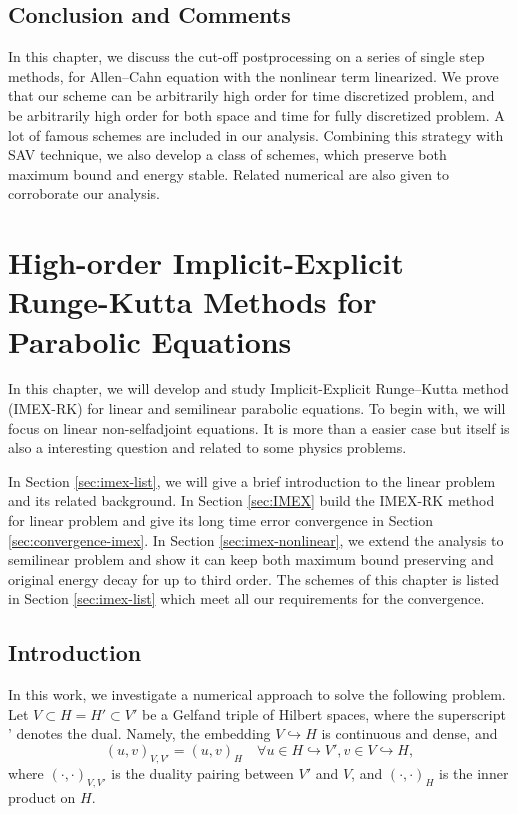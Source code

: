 \documentclass[a4paper, oneside]{book}
\def\embed{{\hookrightarrow}}
\begin{document}
\section{Conclusion and Comments}

In this chapter, we discuss the cut-off postprocessing on a series of single step methods, for Allen--Cahn equation with the nonlinear term linearized. We prove that our scheme can be arbitrarily high order for time discretized problem, and be arbitrarily high order for both space and time for fully discretized problem. A lot of famous schemes are included in our analysis. Combining this strategy with SAV technique, we also develop a class of schemes, which preserve both maximum bound and energy stable. Related numerical are also given to corroborate our analysis. 



\chapter{High-order Implicit-Explicit
Runge-Kutta Methods for Parabolic Equations}

In this chapter, we will develop and study Implicit-Explicit Runge--Kutta method (IMEX-RK) for linear and semilinear parabolic equations. To begin with, we will focus on linear non-selfadjoint equations. It is more than a easier case but itself is also a interesting question and related to some physics problems. 

In Section \ref{sec:imex-list}, we will give a brief introduction to the linear problem and its related background. In Section \ref{sec:IMEX} build the IMEX-RK method for linear problem and give its long time error convergence in Section \ref{sec:convergence-imex}. In Section \ref{sec:imex-nonlinear}, we extend the analysis to semilinear problem and show it can keep both maximum bound preserving and original energy decay for up to third order. The schemes of this chapter is listed in Section \ref{sec:imex-list} which meet all our requirements for the convergence. 


\section{Introduction}\label{Sec:intro}\label{Sec:3.1}
In this work, we investigate a numerical approach to solve the following problem. 
Let $V \subset H = H' \subset V'$ be a Gelfand triple of Hilbert spaces, 
where the superscript ' denotes the dual. 
Namely, the embedding $V\embed H$ is continuous and dense, and 
$$(u, v)_{V, V'} = (u,v)_H \quad \forall u \in H \embed V', v \in V \embed H,$$
where $(\cdot, \cdot)_{V, V'}$ is the duality pairing between $V'$ and $V$, 
and $(\cdot,\cdot)_H$ is the inner product on $H$. 
\end{document}
